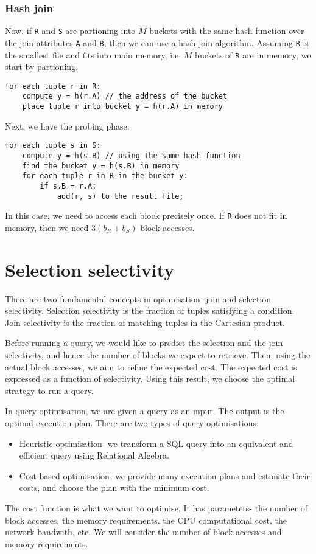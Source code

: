 \documentclass[a4paper, openany]{memoir}
\theoremstyle{definition}
\theoremstyle{plain}
\begin{document}
\subsubsection{Hash join}
Now, if \texttt{R} and \texttt{S} are partioning into $M$ buckets with the same hash function over the join attributes \texttt{A} and \texttt{B}, then we can use a hash-join algorithm. Assuming \texttt{R} is the smallest file and fits into main memory, i.e. $M$ buckets of \texttt{R} are in memory, we start by partioning.
\begin{verbatim}
for each tuple r in R:
    compute y = h(r.A) // the address of the bucket
    place tuple r into bucket y = h(r.A) in memory
\end{verbatim}
Next, we have the probing phase.
\begin{verbatim}
for each tuple s in S:
    compute y = h(s.B) // using the same hash function
    find the bucket y = h(s.B) in memory
    for each tuple r in R in the bucket y:
        if s.B = r.A:
            add(r, s) to the result file;
\end{verbatim}
In this case, we need to access each block precisely once. If \texttt{R} does not fit in memory, then we need $3(b_R + b_S)$ block accesses.

\newpage

\section{Selection selectivity}
There are two fundamental concepts in optimisation- join and selection selectivity. Selection selectivity is the fraction of tuples satisfying a condition. Join selectivity is the fraction of matching tuples in the Cartesian product.

Before running a query, we would like to predict the selection and the join selectivity, and hence the number of blocks we expect to retrieve. Then, using the actual block accesses, we aim to refine the expected cost. The expected cost is expressed as a function of selectivity. Using this result, we choose the optimal strategy to run a query.

In query optimisation, we are given a query as an input. The output is the optimal execution plan. There are two types of query optimisations:
\begin{itemize}
    \item Heuristic optimisation- we transform a SQL query into an equivalent and efficient query using Relational Algebra.
    \item Cost-based optimisation- we provide many execution plans and estimate their costs, and choose the plan with the minimum cost.
\end{itemize}
The cost function is what we want to optimise. It has parameters- the number of block accesses, the memory requirements, the CPU computational cost, the network bandwith, etc. We will consider the number of block accesses and memory requirements. 
\end{document}
